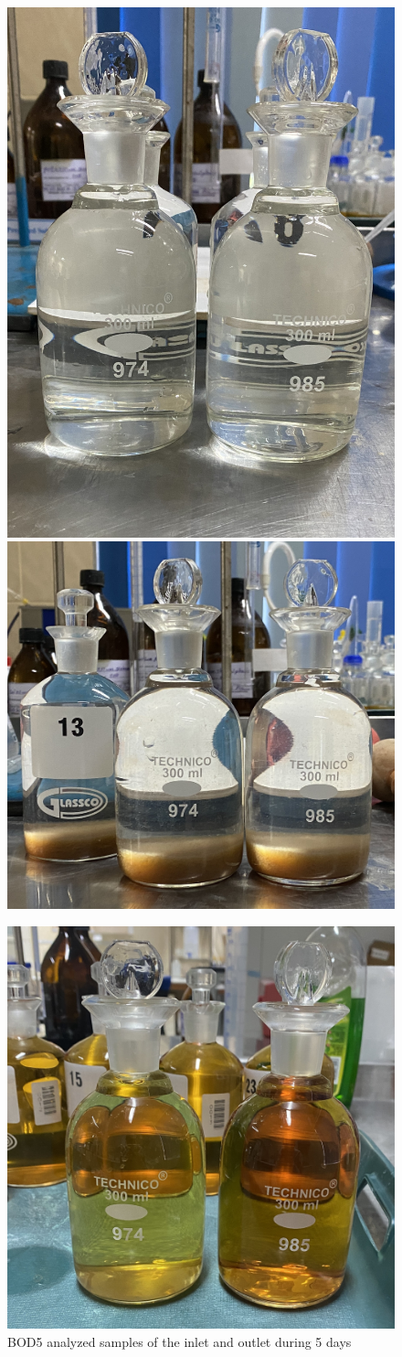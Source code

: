 \begin{figure}[H]
\centering

\includegraphics[width=.385\textwidth]{results/bod_before.JPG}\hfill
\includegraphics[width=.55\textwidth]{results/bod_precipitate.JPG}\hfill

\vspace{3mm}

\includegraphics[width=.5\textwidth]{results/bod_after.JPG}\hfill

\caption{\ac{BOD5} analyzed samples of the inlet and outlet during 5 days}
\label{fig: bod_before_after_samples}
\end{figure}